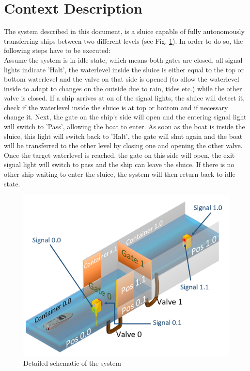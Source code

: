 
\section{Context Description}
The system described in this document, is a sluice capable of fully autonomously transferring ships between two different levels (see Fig. \ref{fig:boat1}). In order to do so, the following steps have to be executed:\\
Assume the system is in idle state, which means both gates are closed, all signal lights indicate 'Halt', the waterlevel inside the sluice is either equal to the top or bottom waterlevel and the valve on that side is opened (to allow the waterlevel inside to adapt to changes on the outside due to rain, tides etc.) while the other valve is closed. If a ship arrives at on of the signal lights, the sluice will detect it, check if the waterlevel inside the sluice is at top or bottom and if necessary change it. Next, the gate on the ship's side will open and the entering signal light will switch to 'Pass', allowing the boat to enter. As soon as the boat is inside the sluice, this light will switch back to 'Halt', the gate will shut again and the boat will be transferred to the other level by closing one and opening the other valve. Once the target waterlevel is reached, the gate on this side will open, the exit signal light will switch to pass and the ship can leave the sluice. If there is no other ship waiting to enter the sluice, the system will then return back to idle state.

\begin{figure}[!h]
	\includegraphics[width=\linewidth]{PictureName10}
	\caption{Detailed schematic of the system}
	\label{fig:boat1}
\end{figure}